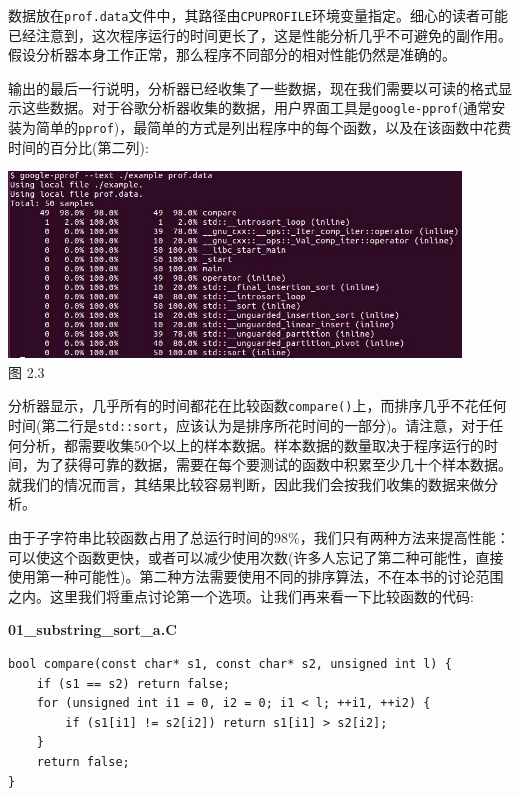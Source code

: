 数据放在\texttt{prof.data}文件中，其路径由\texttt{CPUPROFILE}环境变量指定。细心的读者可能已经注意到，这次程序运行的时间更长了，这是性能分析几乎不可避免的副作用。假设分析器本身工作正常，那么程序不同部分的相对性能仍然是准确的。

输出的最后一行说明，分析器已经收集了一些数据，现在我们需要以可读的格式显示这些数据。对于谷歌分析器收集的数据，用户界面工具是\texttt{google-pprof}(通常安装为简单的\texttt{pprof})，最简单的方式是列出程序中的每个函数，以及在该函数中花费时间的百分比(第二列):

\begin{center}
\includegraphics[width=0.9\textwidth]{content/1/chapter2/images/3.jpg}\\
图 2.3
\end{center}

分析器显示，几乎所有的时间都花在比较函数\texttt{compare()}上，而排序几乎不花任何时间(第二行是\texttt{std::sort}，应该认为是排序所花时间的一部分)。请注意，对于任何分析，都需要收集50个以上的样本数据。样本数据的数量取决于程序运行的时间，为了获得可靠的数据，需要在每个要测试的函数中积累至少几十个样本数据。就我们的情况而言，其结果比较容易判断，因此我们会按我们收集的数据来做分析。

由于子字符串比较函数占用了总运行时间的98\%，我们只有两种方法来提高性能：可以使这个函数更快，或者可以减少使用次数(许多人忘记了第二种可能性，直接使用第一种可能性)。第二种方法需要使用不同的排序算法，不在本书的讨论范围之内。这里我们将重点讨论第一个选项。让我们再来看一下比较函数的代码:

\noindent
\textbf{01\_substring\_sort\_a.C}
\begin{lstlisting}[style=styleCXX]
bool compare(const char* s1, const char* s2, unsigned int l) {
	if (s1 == s2) return false;
	for (unsigned int i1 = 0, i2 = 0; i1 < l; ++i1, ++i2) {
		if (s1[i1] != s2[i2]) return s1[i1] > s2[i2];
	}
	return false;
}
\end{lstlisting}

